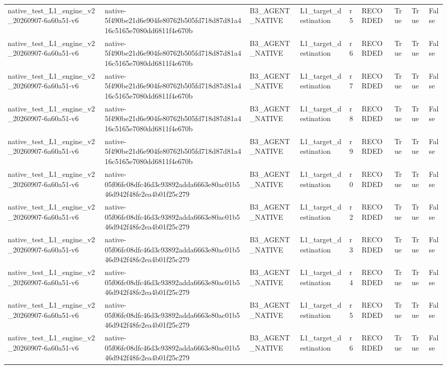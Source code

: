 \begin{tabular}{lllllllll}
native\_test\_L1\_engine\_v2\_20260907-6a60a51-v6 & native-5f490be21d6e904fe80762b505fd718d87d81a416c5165e7080dd6811f4e670b & B3\_AGENT\_NATIVE & L1\_target\_destination & r5 & RECORDED & True & True & False \\
native\_test\_L1\_engine\_v2\_20260907-6a60a51-v6 & native-5f490be21d6e904fe80762b505fd718d87d81a416c5165e7080dd6811f4e670b & B3\_AGENT\_NATIVE & L1\_target\_destination & r6 & RECORDED & True & True & False \\
native\_test\_L1\_engine\_v2\_20260907-6a60a51-v6 & native-5f490be21d6e904fe80762b505fd718d87d81a416c5165e7080dd6811f4e670b & B3\_AGENT\_NATIVE & L1\_target\_destination & r7 & RECORDED & True & True & False \\
native\_test\_L1\_engine\_v2\_20260907-6a60a51-v6 & native-5f490be21d6e904fe80762b505fd718d87d81a416c5165e7080dd6811f4e670b & B3\_AGENT\_NATIVE & L1\_target\_destination & r8 & RECORDED & True & True & False \\
native\_test\_L1\_engine\_v2\_20260907-6a60a51-v6 & native-5f490be21d6e904fe80762b505fd718d87d81a416c5165e7080dd6811f4e670b & B3\_AGENT\_NATIVE & L1\_target\_destination & r9 & RECORDED & True & True & False \\
native\_test\_L1\_engine\_v2\_20260907-6a60a51-v6 & native-05f06fc08dfc46d3c93892adda6663e80ac01b546d942f48fe2ea4b01f25c279 & B3\_AGENT\_NATIVE & L1\_target\_destination & r0 & RECORDED & True & True & False \\
native\_test\_L1\_engine\_v2\_20260907-6a60a51-v6 & native-05f06fc08dfc46d3c93892adda6663e80ac01b546d942f48fe2ea4b01f25c279 & B3\_AGENT\_NATIVE & L1\_target\_destination & r2 & RECORDED & True & True & False \\
native\_test\_L1\_engine\_v2\_20260907-6a60a51-v6 & native-05f06fc08dfc46d3c93892adda6663e80ac01b546d942f48fe2ea4b01f25c279 & B3\_AGENT\_NATIVE & L1\_target\_destination & r3 & RECORDED & True & True & False \\
native\_test\_L1\_engine\_v2\_20260907-6a60a51-v6 & native-05f06fc08dfc46d3c93892adda6663e80ac01b546d942f48fe2ea4b01f25c279 & B3\_AGENT\_NATIVE & L1\_target\_destination & r4 & RECORDED & True & True & False \\
native\_test\_L1\_engine\_v2\_20260907-6a60a51-v6 & native-05f06fc08dfc46d3c93892adda6663e80ac01b546d942f48fe2ea4b01f25c279 & B3\_AGENT\_NATIVE & L1\_target\_destination & r5 & RECORDED & True & True & False \\
native\_test\_L1\_engine\_v2\_20260907-6a60a51-v6 & native-05f06fc08dfc46d3c93892adda6663e80ac01b546d942f48fe2ea4b01f25c279 & B3\_AGENT\_NATIVE & L1\_target\_destination & r6 & RECORDED & True & True & False \\

\end{tabular}
